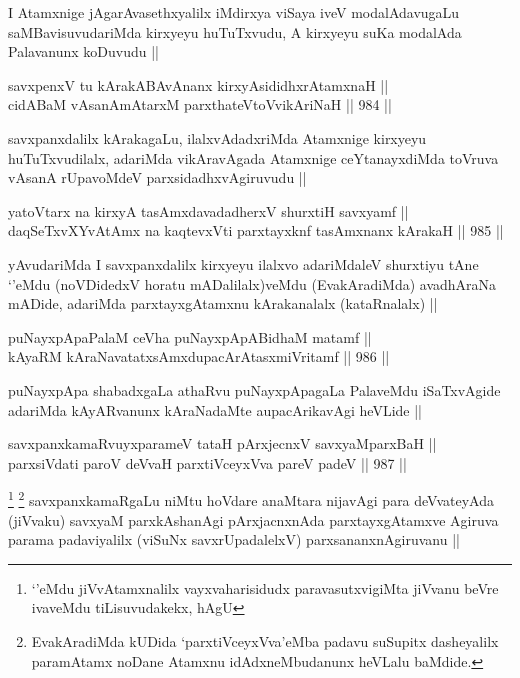 \begin{artha}
I Atamxnige jAgarAvasethxyalilx iMdirxya viSaya iveV modalAdavugaLu saMBavisuvudariMda kirxyeyu huTuTxvudu, A kirxyeyu suKa modalAda Palavanunx koDuvudu ||
\end{artha}

\begin{shl}
savxpenxV tu kArakABAvAnanx kirxyAsididhxrAtamxnaH || \\
cidABaM vAsanAmAtarxM parxthateV\s toV\s vikAriNaH ||  984 ||  
\end{shl}

\begin{artha}
savxpanxdalilx kArakagaLu, ilalxvAdadxriMda Atamxnige kirxyeyu huTuTxvudilalx, adariMda vikAravAgada Atamxnige ceYtanayxdiMda toVruva vAsanA rUpavoMdeV parxsidadhxvAgiruvudu ||
\end{artha}


\begin{shl}
yatoV\s tarx na kirxyA tasAmxdavadadherxV shurxtiH savxyamf ||  \\
daqSeTxvXYvA\s \s tAmx na kaqtevxVti parxtayxknf tasAmxnanx kArakaH ||  985 ||  
\end{shl}

\begin{artha}
yAvudariMda I savxpanxdalilx kirxyeyu ilalxvo adariMdaleV shurxtiyu tAne `\stext'eMdu (noVDidedxV horatu mADalilalx)veMdu (EvakAradiMda) avadhAraNa mADide, adariMda parxtayxgAtamxnu kArakanalalx (kataRnalalx) ||
\end{artha}

\begin{shl}
puNayxpApaPalaM ceVha puNayxpApABidhaM matamf || \\
kAyaRM kAraNavatatxsAmxdupacArAtasxmiVritamf ||  986 || 
\end{shl}

\begin{artha}
puNayxpApa shabadxgaLa athaRvu puNayxpApagaLa PalaveMdu iSaTxvAgide adariMda kAyARvanunx kAraNadaMte aupacArikavAgi heVLide ||
\end{artha}

\begin{shl}
savxpanxkamaRvuyxparameV tataH pArxjecnxV savxyaMparxBaH || \\
parxsiVdati paroV deVvaH parxtiVceyxVva pareV padeV ||  987 ||  
\end{shl}

\begin{artha}
\footnote{`\stext'eMdu jiVvAtamxnalilx vayxvaharisidudx paravasutxvigiMta jiVvanu beVre ivaveMdu tiLisuvudakekx, hAgU}
\footnote{EvakAradiMda kUDida `parxtiVceyxVva'eMba padavu suSupitx dasheyalilx paramAtamx noDane Atamxnu idAdxneMbudanunx heVLalu baMdide.}
savxpanxkamaRgaLu niMtu hoVdare anaMtara nijavAgi para deVvateyAda (jiVvaku)
savxyaM parxkAshanAgi pArxjacnxnAda parxtayxgAtamxve Agiruva parama padaviyalilx (viSuNx savxrUpadalelxV) parxsananxnAgiruvanu ||
\end{artha}

